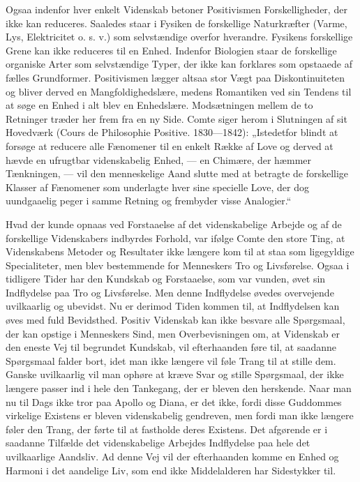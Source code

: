 \documentclass[12pt,a4paper,openany]{book}
\newcommand{\opage}[1]{\marginnote{\footnotesize\textit{[#1]}}}
\begin{document}
Ogsaa indenfor hver enkelt Videnskab betoner Positivismen Forskelligheder,
der ikke kan reduceres. Saaledes staar i Fysiken de forskellige
Naturkræfter (Varme, Lys, Elektricitet o. s. v.) som selvstændige
overfor hverandre. Fysikens forskellige Grene kan ikke reduceres
til en Enhed. Indenfor Biologien staar de forskellige organiske
Arter som selvstændige Typer, der ikke kan forklares som opstaaede
af fælles Grundformer. Positivismen lægger altsaa stor Vægt
paa Diskontinuiteten og bliver derved en Mangfoldighedslære, medens
Romantiken ved sin Tendens til at søge en Enhed i alt blev
en Enhedslære. Modsætningen mellem de to Retninger træder her
frem fra en ny Side. Comte siger herom i Slutningen af sit Hovedværk
(Cours de Philosophie Positive. 1830---1842): „Istedetfor blindt
at forsøge at reducere alle Fænomener til en enkelt Række af Love
og derved at hævde en ufrugtbar videnskabelig Enhed, --- en Chimære,
der hæmmer Tænkningen, --- vil den menneskelige Aand
slutte med at betragte de forskellige Klasser af Fænomener som
underlagte hver sine specielle Love, der dog uundgaaelig peger i
samme Retning og frembyder visse Analogier.“

\opage{18}Hvad der kunde opnaas ved Forstaaelse af det videnskabelige Arbejde
og af de forskellige Videnskabers indbyrdes Forhold, var ifølge
Comte den store Ting, at Videnskabens Metoder og Resultater ikke
længere kom til at staa som ligegyldige Specialiteter, men blev bestemmende
for Menneskers Tro og Livsførelse. Ogsaa i tidligere Tider
har den Kundskab og Forstaaelse, som var vunden, øvet sin
Indflydelse paa Tro og Livsførelse. Men denne Indflydelse øvedes
overvejende uvilkaarlig og ubevidst. Nu er derimod Tiden kommen
til, at Indflydelsen kan øves med fuld Bevidsthed. Positiv Videnskab
kan ikke besvare alle Spørgsmaal, der kan opstige i Menneskers
Sind, men Overbevisningen om, at Videnskab er den eneste Vej til
begrundet Kundskab, vil efterhaanden føre til, at saadanne Spørgsmaal
falder bort, idet man ikke længere vil føle Trang til at stille
dem. Ganske uvilkaarlig vil man ophøre at kræve Svar og stille
Spørgsmaal, der ikke længere passer ind i hele den Tankegang, der
er bleven den herskende. Naar man nu til Dags ikke tror paa Apollo
og Diana, er det ikke, fordi disse Guddommes virkelige Existens er
bleven videnskabelig gendreven, men fordi man ikke længere føler
den Trang, der førte til at fastholde deres Existens. Det afgørende
er i saadanne Tilfælde det videnskabelige Arbejdes Indflydelse paa
hele det uvilkaarlige Aandsliv. Ad denne Vej vil der efterhaanden
komme en Enhed og Harmoni i det aandelige Liv, som end ikke
Middelalderen har Sidestykker til.
\end{document}
